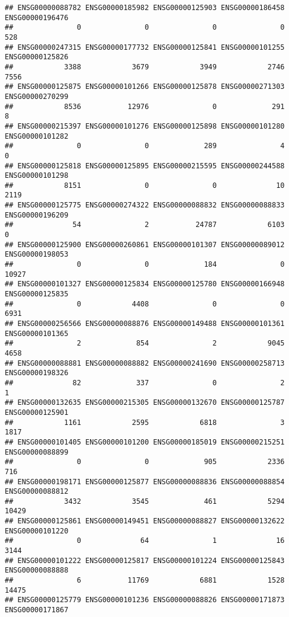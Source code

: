 \documentclass[
]{article}
\begin{document}
\begin{verbatim}
## ENSG00000088782 ENSG00000185982 ENSG00000125903 ENSG00000186458 ENSG00000196476 
##               0               0               0               0             528 
## ENSG00000247315 ENSG00000177732 ENSG00000125841 ENSG00000101255 ENSG00000125826 
##            3388            3679            3949            2746            7556 
## ENSG00000125875 ENSG00000101266 ENSG00000125878 ENSG00000271303 ENSG00000270299 
##            8536           12976               0             291               8 
## ENSG00000215397 ENSG00000101276 ENSG00000125898 ENSG00000101280 ENSG00000101282 
##               0               0             289               4               0 
## ENSG00000125818 ENSG00000125895 ENSG00000215595 ENSG00000244588 ENSG00000101298 
##            8151               0               0              10            2119 
## ENSG00000125775 ENSG00000274322 ENSG00000088832 ENSG00000088833 ENSG00000196209 
##              54               2           24787            6103               0 
## ENSG00000125900 ENSG00000260861 ENSG00000101307 ENSG00000089012 ENSG00000198053 
##               0               0             184               0           10927 
## ENSG00000101327 ENSG00000125834 ENSG00000125780 ENSG00000166948 ENSG00000125835 
##               0            4408               0               0            6931 
## ENSG00000256566 ENSG00000088876 ENSG00000149488 ENSG00000101361 ENSG00000101365 
##               2             854               2            9045            4658 
## ENSG00000088881 ENSG00000088882 ENSG00000241690 ENSG00000258713 ENSG00000198326 
##              82             337               0               2               1 
## ENSG00000132635 ENSG00000215305 ENSG00000132670 ENSG00000125787 ENSG00000125901 
##            1161            2595            6818               3            1817 
## ENSG00000101405 ENSG00000101200 ENSG00000185019 ENSG00000215251 ENSG00000088899 
##               0               0             905            2336             716 
## ENSG00000198171 ENSG00000125877 ENSG00000088836 ENSG00000088854 ENSG00000088812 
##            3432            3545             461            5294           10429 
## ENSG00000125861 ENSG00000149451 ENSG00000088827 ENSG00000132622 ENSG00000101220 
##               0              64               1              16            3144 
## ENSG00000101222 ENSG00000125817 ENSG00000101224 ENSG00000125843 ENSG00000088888 
##               6           11769            6881            1528           14475 
## ENSG00000125779 ENSG00000101236 ENSG00000088826 ENSG00000171873 ENSG00000171867 

\end{verbatim}
\end{document}
